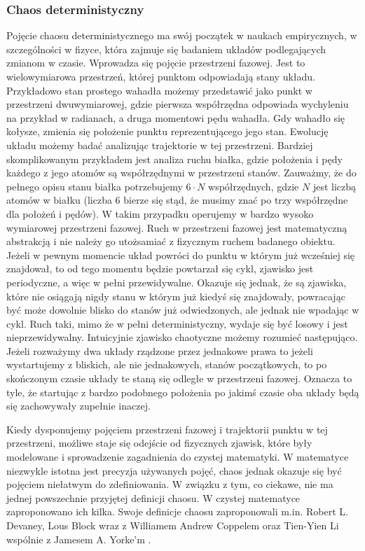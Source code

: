 \documentclass[licencjacka]{pwr_wmat_praca_dyplomowa}
\theoremstyle{plain}
\numberwithin{theorem}{chapter}
\theoremstyle{definition}
\numberwithin{theorem}{chapter}
\begin{document}
\subsubsection{Chaos deterministyczny}
Pojęcie chaosu deterministycznego ma swój początek w naukach empirycznych, w szczególności w fizyce, która zajmuje się badaniem układów podlegających zmianom w czasie. Wprowadza się pojęcie przestrzeni fazowej. Jest to wielowymiarowa przestrzeń, której punktom odpowiadają stany układu. Przykładowo stan prostego wahadła możemy przedstawić jako punkt w przestrzeni dwuwymiarowej, gdzie pierwsza współrzędna odpowiada wychyleniu na przykład w radianach, a druga momentowi pędu wahadła. Gdy wahadło się kołysze, zmienia się położenie punktu reprezentującego jego stan. Ewolucję układu możemy badać analizując trajektorie w tej przestrzeni. Bardziej skomplikowanym przykładem jest analiza ruchu białka, gdzie położenia i pędy każdego z jego atomów są współrzędnymi w przestrzeni stanów. Zauważmy, że do pełnego opisu stanu białka potrzebujemy $6 \cdot N$ współrzędnych, gdzie $N$ jest liczbą atomów w białku (liczba 6 bierze się stąd, że musimy znać po trzy współrzędne dla położeń i pędów). W takim przypadku operujemy w bardzo wysoko wymiarowej przestrzeni fazowej. Ruch w przestrzeni fazowej jest matematyczną abstrakcją i nie należy go utożsamiać z fizycznym ruchem badanego obiektu. Jeżeli w pewnym momencie układ powróci do punktu w którym już wcześniej się znajdował, to od tego momentu będzie powtarzał się cykl, zjawisko jest periodyczne, a więc w pełni przewidywalne. Okazuje się jednak, że są zjawiska, które nie osiągają nigdy stanu w którym już kiedyś się znajdowały, powracając być może dowolnie blisko do stanów już odwiedzonych, ale jednak nie wpadając w cykl. Ruch taki, mimo że w pełni deterministyczny, wydaje się być losowy i jest nieprzewidywalny. Intuicyjnie zjawisko chaotyczne możemy rozumieć następująco. Jeżeli rozważymy dwa układy rządzone przez jednakowe prawa to jeżeli wystartujemy z bliskich, ale nie jednakowych, stanów początkowych, to po skończonym czasie układy te staną się odległe w przestrzeni fazowej. Oznacza to tyle, że startując z bardzo podobnego położenia po jakimś czasie oba układy będą się zachowywały zupełnie inaczej.

Kiedy dysponujemy pojęciem przestrzeni fazowej i trajektorii punktu w tej przestrzeni, możliwe staje się odejście od fizycznych zjawisk, które były modelowane i sprowadzenie zagadnienia do czystej matematyki. W matematyce niezwykle istotna jest precyzja używanych pojęć, chaos jednak okazuje się być pojęciem niełatwym do zdefiniowania. W związku z tym, co ciekawe, nie ma jednej powszechnie przyjętej definicji chaosu. W czystej matematyce zaproponowano ich kilka. 
Swoje definicje chaosu zaproponowali m.in. Robert L. Devaney, Lous Block wraz z Williamem Andrew Coppelem oraz Tien-Yien Li wspólnie z Jamesem A. Yorke'm 
\cite{aulbach2001three}.
\end{document}
